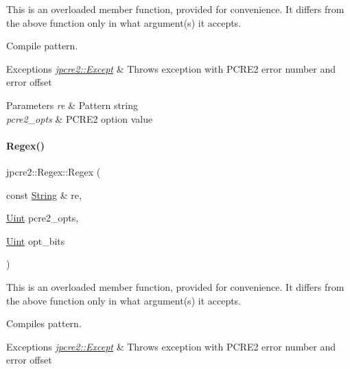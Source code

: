 This is an overloaded member function, provided for convenience. It differs from the above function only in what argument(s) it accepts. 

Compile pattern. 
\begin{DoxyExceptions}{Exceptions}
{\em \hyperlink{classjpcre2_1_1Except}{jpcre2\+::\+Except}} & Throws exception with P\+C\+R\+E2 error number and error offset \\
\hline
\end{DoxyExceptions}

\begin{DoxyParams}{Parameters}
{\em re} & Pattern string \\
\hline
{\em pcre2\+\_\+opts} & P\+C\+R\+E2 option value \\
\hline
\end{DoxyParams}
\hypertarget{classjpcre2_1_1Regex_abe210e2ca6cfcef11760875930cf069d_abe210e2ca6cfcef11760875930cf069d}{}\label{classjpcre2_1_1Regex_abe210e2ca6cfcef11760875930cf069d_abe210e2ca6cfcef11760875930cf069d} 
\paragraph{\texorpdfstring{Regex()}{Regex()}\hspace{0.1cm}{\footnotesize\ttfamily [5/6]}}
{\footnotesize\ttfamily jpcre2\+::\+Regex\+::\+Regex (\begin{DoxyParamCaption}\item[{const \hyperlink{namespacejpcre2_a91f03070152fb228bc116c5a737f1d16}{String} \&}]{re,  }\item[{\hyperlink{namespacejpcre2_a078242d38221a13fb3543b9edd78c099}{Uint}}]{pcre2\+\_\+opts,  }\item[{\hyperlink{namespacejpcre2_a078242d38221a13fb3543b9edd78c099}{Uint}}]{opt\+\_\+bits }\end{DoxyParamCaption})\hspace{0.3cm}{\ttfamily [inline]}}



This is an overloaded member function, provided for convenience. It differs from the above function only in what argument(s) it accepts. 

Compiles pattern. 
\begin{DoxyExceptions}{Exceptions}
{\em \hyperlink{classjpcre2_1_1Except}{jpcre2\+::\+Except}} & Throws exception with P\+C\+R\+E2 error number and error offset \\
\hline
\end{DoxyExceptions}

